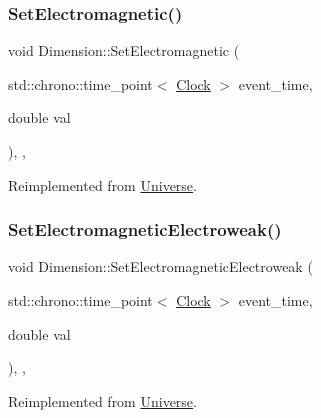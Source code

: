 \subsubsection{\texorpdfstring{Set\+Electromagnetic()}{SetElectromagnetic()}}
{\footnotesize\ttfamily void Dimension\+::\+Set\+Electromagnetic (\begin{DoxyParamCaption}\item[{std\+::chrono\+::time\+\_\+point$<$ \mbox{\hyperlink{universe_8h_a0ef8d951d1ca5ab3cfaf7ab4c7a6fd80}{Clock}} $>$}]{event\+\_\+time,  }\item[{double}]{val }\end{DoxyParamCaption})\hspace{0.3cm}{\ttfamily [inline]}, {\ttfamily [final]}, {\ttfamily [virtual]}}



Reimplemented from \mbox{\hyperlink{classUniverse_aa981fc7e252b1fbbb675f0371860954d}{Universe}}.

\mbox{\label{classDimension_aead73fc6a25388d14b514b2170735b1b}} 
\subsubsection{\texorpdfstring{Set\+Electromagnetic\+Electroweak()}{SetElectromagneticElectroweak()}}
{\footnotesize\ttfamily void Dimension\+::\+Set\+Electromagnetic\+Electroweak (\begin{DoxyParamCaption}\item[{std\+::chrono\+::time\+\_\+point$<$ \mbox{\hyperlink{universe_8h_a0ef8d951d1ca5ab3cfaf7ab4c7a6fd80}{Clock}} $>$}]{event\+\_\+time,  }\item[{double}]{val }\end{DoxyParamCaption})\hspace{0.3cm}{\ttfamily [inline]}, {\ttfamily [final]}, {\ttfamily [virtual]}}



Reimplemented from \mbox{\hyperlink{classUniverse_a608aa95698380f791a0ffba45cc1bee3}{Universe}}.

\mbox{\label{classDimension_aeec6887382d09e3d78382582ff4e7c33}} 
